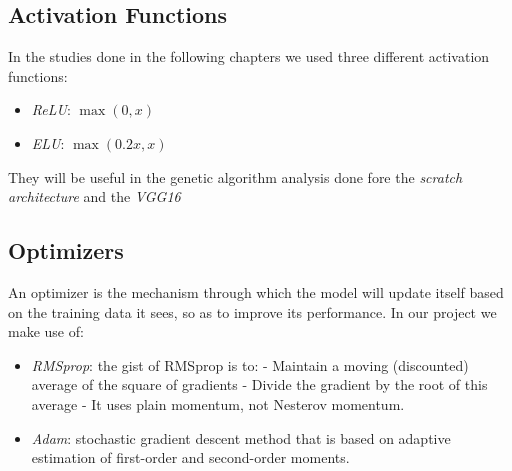 \subsection{Activation Functions}
In the studies done in the following chapters we used three different activation functions:
\begin{itemize}
	\item \textit{ReLU}: 
	$ \max (0,x) $
	\item \textit{ELU}: $ \max (0.2x,x) $
\end{itemize}
They will be useful in the genetic algorithm analysis done fore the \textit{scratch architecture} and the \textit{VGG16}

\subsection{Optimizers}
An optimizer is the mechanism through which the model will update itself based on the training data it sees, so as to improve its performance. In our project we make use of:

\begin{itemize}
	\item \textit{RMSprop}: the gist of RMSprop is to:
		\subitem - Maintain a moving (discounted) average of the square of gradients
		\subitem - Divide the gradient by the root of this average
		\subitem - It uses plain momentum, not Nesterov momentum.
	\item \textit{Adam}: stochastic gradient descent method that is based on adaptive estimation of first-order and second-order moments.
\end{itemize}

